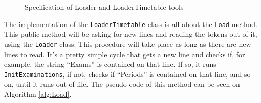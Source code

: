 \begin{figure}[t!]
\centering
{}

\caption{Specification of Loader and LoaderTimetable tools} \label{fig:Loaders}
\end{figure}The implementation of the \verb+LoaderTimetable+ class is all about the \verb+Load+ method. This public method will be asking for new lines and reading the tokens out of it, using the \verb+Loader+ class. This procedure will take place as long as there are new lines to read. It's a pretty simple cycle that gets a new line and checks if, for example, the string ``Exams'' is contained on that line. If so, it runs \verb+InitExaminations+, if not, checks if ``Periods'' is contained on that line, and so on, until it runs out of file. The pseudo code of this method can be seen on Algorithm \ref{alg:Load}.\\
\\
